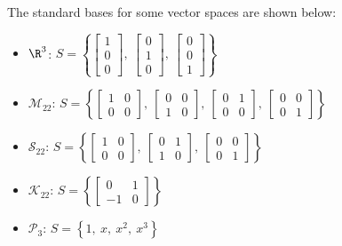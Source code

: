 \documentclass{article}
\begin{document}
\begin{multicols*}{3}
    The standard bases for some vector spaces are shown below:
    \begin{itemize}
        \item \(\R^3\): \(S = \left\{ \begin{bmatrix*}
                  1 \\ 0 \\ 0
              \end{bmatrix*},\: \begin{bmatrix*}
                  0 \\ 1 \\ 0
              \end{bmatrix*},\: \begin{bmatrix*}
                  0 \\ 0 \\ 1
              \end{bmatrix*} \right\}\)
        \item \(\mathscr{M}_{22}\): \(S = \left\{ \begin{bmatrix*}
                  1 & 0 \\
                  0 & 0
              \end{bmatrix*},\: \begin{bmatrix*}
                  0 & 0 \\
                  1 & 0
              \end{bmatrix*},\: \begin{bmatrix*}
                  0 & 1 \\
                  0 & 0
              \end{bmatrix*},\: \begin{bmatrix*}
                  0 & 0 \\
                  0 & 1
              \end{bmatrix*} \right\}\)
        \item \(\mathscr{S}_{22}\): \(S = \left\{ \begin{bmatrix*}
                  1 & 0 \\
                  0 & 0
              \end{bmatrix*},\: \begin{bmatrix*}
                  0 & 1 \\
                  1 & 0
              \end{bmatrix*},\: \begin{bmatrix*}
                  0 & 0 \\
                  0 & 1
              \end{bmatrix*} \right\}\)
        \item \(\mathscr{K}_{22}\): \(S = \left\{ \begin{bmatrix*}
                  0 & 1 \\
                  -1 & 0
              \end{bmatrix*}\right\}\)
        \item \(\mathscr{P}_3\): \(S = \left\{ 1,\: x,\: x^2,\: x^3 \right\}\)
    \end{itemize}

\end{multicols*}
\end{document}

